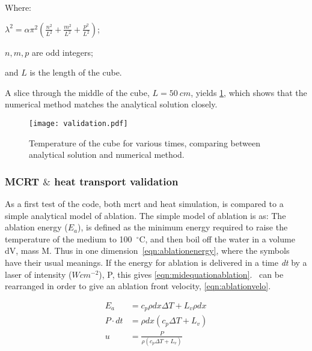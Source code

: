 \noindent Where:

	\indent $\lambda^2=\alpha\pi^2(\tfrac{n^2}{L^2}+\tfrac{m^2}{L^2}+\tfrac{p^2}{L^2})$;
	
	\indent $n,m,p$ are odd integers;
	
	\indent and $L$ is the length of the cube.
	
	\medskip
	
A slice through the middle of the cube, $L=50~cm$,  yields \cref{fig:validation-heat}, which shows that the numerical method matches the analytical solution closely.

\begin{figure}	
\vspace{-10pt}
	\centering
	\texttt{[image: validation.pdf]}
	\caption{Temperature of the cube for various times, comparing between analytical solution and numerical method.}
	\label{fig:validation-heat}
	\vspace{-10pt}
\end{figure}	

\subsubsection*{MCRT \texorpdfstring{$\&$}{and} heat transport validation}


As a first test of the code, both \gls*{mcrt} and heat simulation, is compared to a simple analytical model of ablation. The simple model of ablation is as: The ablation energy ($E_a$), is defined as the minimum energy required to raise the temperature of the medium to 100~$^{\circ}$C, and then boil off the water in a volume dV, mass M. Thus in one dimension~\cref{eqn:ablationenergy}, where the symbols have their usual meanings. If the energy for ablation is delivered in a time \textit{dt} by a laser of intensity ($Wcm^{-2}$), P, this gives \cref{eqn:midequationablation}.~ can be rearranged in order to give an ablation front velocity, \cref{eqn:ablationvelo}.


\begin{align}
E_a &= c_p \rho dx \Delta T + L_v \rho dx \label{eqn:ablationenergy}\\
P\cdot dt &= \rho dx (c_p \Delta T + L_v) \label{eqn:midequationablation} \\
u &= \frac{P}{\rho(c_p\Delta T+ L_v)} \label{eqn:ablationvelo}
\end{align}

